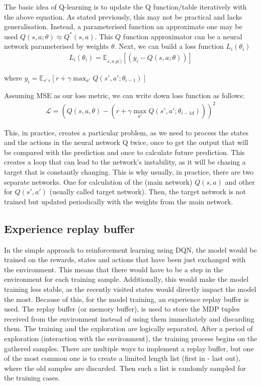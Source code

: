 The basic idea of Q-learning is to update the Q function/table iteratively with the above equation.
As stated previously, this may not be practical and lacks generalisation.
Instead, a parameterised function an approximate one may be used $Q(s,a;\theta) \approx Q^{*}(s,a)$.
This $Q$ function approximator can be a neural network parameterised by weights $\theta$.
Next, we can build a loss function $L_{i}(\theta_{i})$
\begin{align}
L_{i}(\theta_{i}) = \mathbb{E}_{s,a~p(\dot)}\left[(y_{i} - Q(s,a;\theta))\right]
\end{align}

where $y_{i} = \mathbb{E}_{s'~\epsilon}\left[r+\gamma \max_{a'}Q(s',a';\theta_{i-1})\right]$

Assuming MSE as our loss metric, we can write down loss function as follows:
\begin{align}
\mathcal{L} = (Q(s,a,\theta) - (r+\gamma\max_{a'}Q(s',a';\theta_{i-1d})))^{2}
\end{align}

This, in practice, creates a particular problem, as we need to process the states and the actions in the neural network Q twice, once to get the output that will be compared with the prediction and once to calculate future prediction. This creates a loop that can lead to the network's instability, as it will be chasing a target that is constantly changing. This is why usually, in practice, there are two separate networks. One for calculation of the (main network) $Q(s,a)$ and other for $Q(s',a')$ (usually called target network). Then, the target network is not trained but updated periodically with the weights from the main network.

\subsection{Experience replay buffer}

In the simple approach to reinforcement learning using DQN, the model would be trained on the rewards, states and actions that have been just exchanged with the environment.
This means that there would have to be a step in the environment for each training sample.
Additionally, this would make the model training less stable, as the recently visited states would directly impact the model the most.
Because of this, for the model training, an experience replay buffer is used.
The replay buffer (or memory buffer), is used to store the MDP tuples received from the environment instead of using them immediately and discarding them.
The training and the exploration are logically separated.
After a period of exploration (interaction with the environment), the training process begins on the gathered samples.
There are multiple ways to implement a replay buffer, but one of the most common one is to create a limited length list (first in - last out), where the old samples are discarded.
Then such a list is randomly sampled for the training cases.

